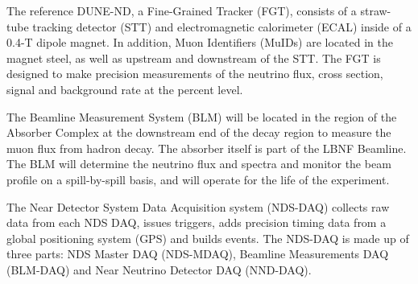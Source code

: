 The reference DUNE-ND, a Fine-Grained Tracker (FGT),
consists of a straw-tube tracking detector (STT) and electromagnetic
calorimeter (ECAL) inside of a 0.4-T dipole magnet. In addition, Muon
Identifiers (MuIDs) are located in the magnet steel, as well as
upstream and downstream of the STT. The FGT is designed to make
precision measurements of the neutrino flux, cross section, signal
and background rate at the percent level.

The Beamline Measurement System (BLM) will be located in the region of
the Absorber Complex at the downstream end of the decay region to
measure the muon flux from hadron decay. The absorber itself is part
of the LBNF Beamline.  The BLM will determine the neutrino
flux and spectra and monitor the beam profile on a spill-by-spill
basis, and will operate for the life of the experiment.

The Near Detector System Data Acquisition system (NDS-DAQ) collects
raw data from each NDS DAQ, issues triggers,
adds precision timing data from a global positioning system (GPS) and
builds events.  The NDS-DAQ is made up of three parts: NDS Master DAQ
(NDS-MDAQ), Beamline Measurements DAQ (BLM-DAQ) and Near
Neutrino Detector DAQ (NND-DAQ).
